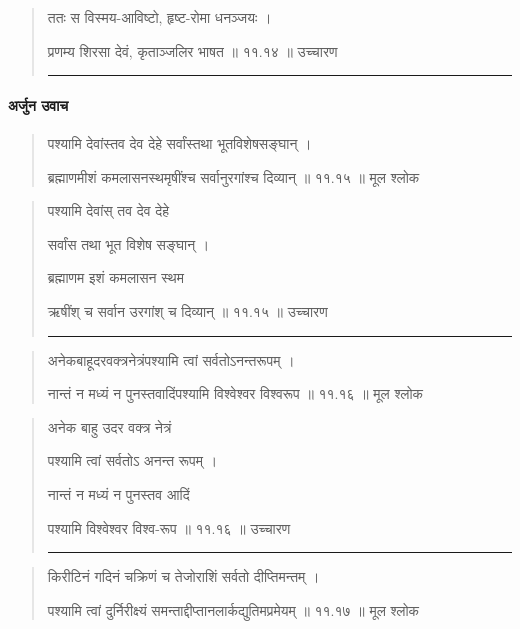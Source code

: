 \begin{quotation}

ततः स विस्मय-आविष्टो, हृष्ट-रोमा धनञ्जयः  ।  

प्रणम्य शिरसा देवं, कृताञ्जलिर भाषत  ॥ ११.१४ ॥  उच्चारण

\noindent\rule{16cm}{0.4pt} 
\end{quotation}




\paragraph{\sanskrit अर्जुन उवाच}
\begin{quotation} 
पश्यामि देवांस्तव देव देहे सर्वांस्तथा भूतविशेषसङ्‍घान्‌  ।  

ब्रह्माणमीशं कमलासनस्थमृषींश्च सर्वानुरगांश्च दिव्यान्‌  ॥ ११.१५ ॥  मूल श्लोक
\end{quotation}

\begin{quotation}

पश्यामि देवांस् तव देव देहे 

सर्वांस तथा भूत विशेष सङ्‍घान्‌  ।  

ब्रह्माणम इशं कमलासन स्थम 

ऋषींश् च सर्वान उरगांश् च दिव्यान्‌  ॥ ११.१५ ॥  उच्चारण

\noindent\rule{16cm}{0.4pt} 
\end{quotation}


\begin{quotation} 
अनेकबाहूदरवक्त्रनेत्रंपश्यामि त्वां सर्वतोऽनन्तरूपम्‌  ।  

नान्तं न मध्यं न पुनस्तवादिंपश्यामि विश्वेश्वर विश्वरूप  ॥ ११.१६ ॥  मूल श्लोक
\end{quotation}

\begin{quotation}

अनेक बाहु उदर वक्त्र नेत्रं

पश्यामि त्वां सर्वतोऽ अनन्त रूपम्‌  ।  

नान्तं न मध्यं न पुनस्तव आदिं

पश्यामि विश्वेश्वर विश्व-रूप  ॥ ११.१६ ॥  उच्चारण

\noindent\rule{16cm}{0.4pt} 
\end{quotation}


\begin{quotation} 

किरीटिनं गदिनं चक्रिणं च तेजोराशिं सर्वतो दीप्तिमन्तम्‌  ।  

पश्यामि त्वां दुर्निरीक्ष्यं समन्ताद्दीप्तानलार्कद्युतिमप्रमेयम्‌  ॥ ११.१७ ॥  मूल श्लोक
\end{quotation}

